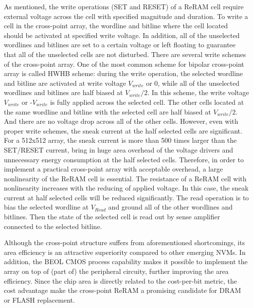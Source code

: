 As mentioned, the write operations (SET and RESET) of a ReRAM cell require external voltage across the cell with specified magnitude and duration. To write a cell in the cross-point array, the wordline and bitline where the cell located should be activated at specified write voltage. In addition, all of the unselected wordlines and bitlines are set to a certain voltage or left floating to guarantee that all of the unselected cells are not disturbed. There are several write schemes of the cross-point array. One of the most common scheme for bipolar cross-point array is called HWHB scheme: during the write operation, the selected wordline and bitline are activated at write voltage $V_{write}$ or $0$, while all of the unselected wordlines and bitlines are half biased at $V_{write}/2$. In this scheme, the write voltage $V_{write}$ or -$V_{write}$ is fully applied across the selected cell. The other cells located at the same wordline and bitline with the selected cell are half biased at $V_{write}/2$. And there are no voltage drop across all of the other cells. However, even with proper write schemes, the sneak current at the half selected cells are significant. For a 512x512 array, the sneak current is more than 500 times larger than the SET/RESET current, bring in huge area overhead of the voltage drivers and unnecessary energy consumption at the half selected cells. Therefore, in order to implement a practical cross-point array with acceptable overhead, a large nonlinearity of the ReRAM cell is essential. The resistance of a ReRAM cell with nonlinearity increases with the reducing of applied voltage. In this case, the sneak current at half selected cells will be reduced significantly. The read operation is to bias the selected wordline at $V_{Read}$ and ground all of the other wordlines and bitlines. Then the state of the selected cell is read out by sense amplifier connected to the selected bitline.


Although the cross-point structure suffers from aforementioned
shortcomings, its area efficiency is an attractive superiority compared to other emerging NVMs. In addition, the BEOL CMOS process capability makes it possible to implement the array on top of (part of) the peripheral circuity, further improving the area efficiency. Since the chip area is directly related to the cost-per-bit metric, the cost advantage make the cross-point ReRAM a promising candidate for DRAM or FLASH replacement.

